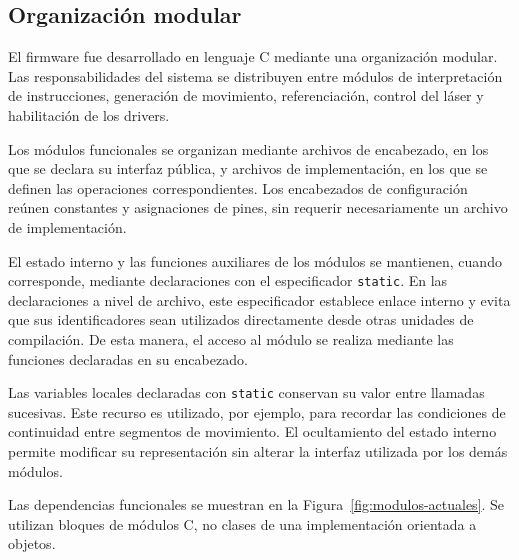 \documentclass[blue,fullpaper]{ludusofficial}  %
\begin{document}
\subsection{Organización modular}

El firmware fue desarrollado en lenguaje C mediante
una organización modular. Las responsabilidades
del sistema se distribuyen entre módulos de
interpretación de instrucciones, generación
de movimiento, referenciación, control del láser
y habilitación de los drivers.

Los módulos funcionales se organizan mediante archivos
de encabezado, en los que se declara su interfaz pública,
y archivos de implementación, en los que se definen las
operaciones correspondientes. Los encabezados de
configuración reúnen constantes y asignaciones de pines,
sin requerir necesariamente un archivo de implementación.

El estado interno y las funciones auxiliares de los
módulos se mantienen, cuando corresponde, mediante
declaraciones con el especificador \texttt{static}.
En las declaraciones a nivel de archivo, este especificador
establece enlace interno y evita que sus identificadores
sean utilizados directamente desde otras unidades de
compilación. De esta manera, el acceso al módulo se realiza
mediante las funciones declaradas en su encabezado.

Las variables locales declaradas con \texttt{static}
conservan su valor entre llamadas sucesivas. Este recurso
es utilizado, por ejemplo, para recordar las condiciones
de continuidad entre segmentos de movimiento. El
ocultamiento del estado interno permite modificar su
representación sin alterar la interfaz utilizada por
los demás módulos.

Las dependencias funcionales se muestran en la Figura~\ref{fig:modulos-actuales}. Se utilizan bloques de módulos C, no clases de una implementación orientada a objetos. 
\end{document}
